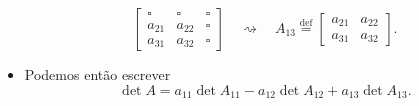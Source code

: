 \begin{itemize}
\begin{equation}
\begin{bmatrix}
\square & \square & \square \\
a_{21}  & a_{22}  & \square \\
a_{31}  & a_{32}  & \square
\end{bmatrix} \quad \rightsquigarrow \quad A_{13} \stackrel{\text{def}}{=}
\begin{bmatrix}
a_{21}  & a_{22} \\
a_{31}  & a_{32}
\end{bmatrix}.
\end{equation}
\item Podemos então escrever
\begin{equation}\label{detminor}
\boxed{\det A = a_{11} \det A_{11} - a_{12} \det A_{12} +  a_{13} \det A_{13}.}
\end{equation}
\end{itemize}


